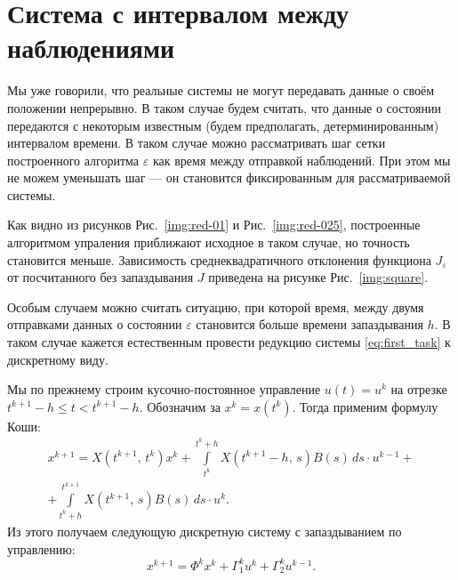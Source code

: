 \section{Система с интервалом между наблюдениями}

Мы уже говорили, что реальные системы не могут передавать данные о своём положении непрерывно. В таком случае будем считать, что данные о состоянии передаются с некоторым известным (будем предполагать, детерминированным) интервалом времени. В таком случае можно рассматривать шаг сетки построенного алгоритма $\varepsilon$ как время между отправкой наблюдений. При этом мы не можем уменьшать шаг --- он становится фиксированным для рассматриваемой системы.

Как видно из рисунков Рис.~\ref{img:red-01} и Рис.~\ref{img:red-025}, построенные алгоритмом упраления приближают исходное в таком случае, но точность становится меньше. Зависимость среднеквадратичного отклонения функциона $J_\varepsilon$ от посчитанного без запаздывания $J$ приведена на рисунке Рис.~\ref{img:square}.

Особым случаем можно считать ситуацию, при которой время, между двумя отправками данных о состоянии $\varepsilon$ становится больше времени запаздывания $h$. В таком случае кажется естественным провести редукцию системы \eqref{eq:first_task} к дискретному виду.

Мы по прежнему строим кусочно-постоянное управление $u(t) = u^k$ на отрезке $t^{k+1} - h \leqslant t < t^{k+1} - h$. Обозначим за $x^{k} = x(t^k)$. Тогда применим формулу Коши:
\begin{multline*}
x^{k+1} = X(t^{k+1},\,t^k)x^k
+
\int\limits_{t^k}^{t^{k} + h} X(t^{k+1} - h,\,s)B(s)\,ds\cdot u^{k-1}
+\\+
\int\limits_{t^{k} + h}^{t^{k+1}} X(t^{k+1},\,s)B(s)\,ds\cdot u^{k}.
\end{multline*}
Из этого получаем следующую дискретную систему с запаздыванием по управлению:
\begin{equation}
        x^{k+1} = \Phi^k x^k + \Gamma_1^k u^{k} + \Gamma_2^k u^{k-1}.
\end{equation}






